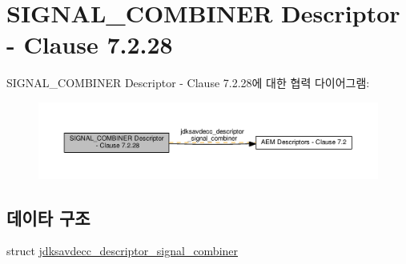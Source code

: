 \hypertarget{group__descriptor__signal__combiner}{}\section{S\+I\+G\+N\+A\+L\+\_\+\+C\+O\+M\+B\+I\+N\+ER Descriptor -\/ Clause 7.2.28}
\label{group__descriptor__signal__combiner}
S\+I\+G\+N\+A\+L\+\_\+\+C\+O\+M\+B\+I\+N\+ER Descriptor -\/ Clause 7.2.28에 대한 협력 다이어그램\+:
\nopagebreak
\begin{figure}[H]
\begin{center}
\leavevmode
\includegraphics[width=350pt]{group__descriptor__signal__combiner}
\end{center}
\end{figure}
\subsection*{데이타 구조}
\begin{DoxyCompactItemize}
\item 
struct \hyperlink{structjdksavdecc__descriptor__signal__combiner}{jdksavdecc\+\_\+descriptor\+\_\+signal\+\_\+combiner}
\end{DoxyCompactItemize}
